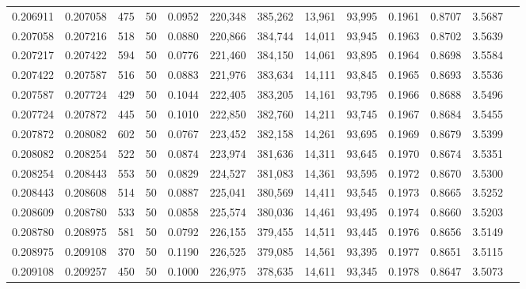 \begin{tabular}{rrrrrrrrrrrrr}
0.206911 & 0.207058 &   475 &  50 &                                     0.0952 & 220,348 & 385,262 &  13,961 &  93,995 & 0.1961 & 0.8707 & 3.5687 \\
0.207058 & 0.207216 &   518 &  50 &                                     0.0880 & 220,866 & 384,744 &  14,011 &  93,945 & 0.1963 & 0.8702 & 3.5639 \\
0.207217 & 0.207422 &   594 &  50 &                                     0.0776 & 221,460 & 384,150 &  14,061 &  93,895 & 0.1964 & 0.8698 & 3.5584 \\
0.207422 & 0.207587 &   516 &  50 &                                     0.0883 & 221,976 & 383,634 &  14,111 &  93,845 & 0.1965 & 0.8693 & 3.5536 \\
0.207587 & 0.207724 &   429 &  50 &                                     0.1044 & 222,405 & 383,205 &  14,161 &  93,795 & 0.1966 & 0.8688 & 3.5496 \\
0.207724 & 0.207872 &   445 &  50 &                                     0.1010 & 222,850 & 382,760 &  14,211 &  93,745 & 0.1967 & 0.8684 & 3.5455 \\
0.207872 & 0.208082 &   602 &  50 &                                     0.0767 & 223,452 & 382,158 &  14,261 &  93,695 & 0.1969 & 0.8679 & 3.5399 \\
0.208082 & 0.208254 &   522 &  50 &                                     0.0874 & 223,974 & 381,636 &  14,311 &  93,645 & 0.1970 & 0.8674 & 3.5351 \\
0.208254 & 0.208443 &   553 &  50 &                                     0.0829 & 224,527 & 381,083 &  14,361 &  93,595 & 0.1972 & 0.8670 & 3.5300 \\
0.208443 & 0.208608 &   514 &  50 &                                     0.0887 & 225,041 & 380,569 &  14,411 &  93,545 & 0.1973 & 0.8665 & 3.5252 \\
0.208609 & 0.208780 &   533 &  50 &                                     0.0858 & 225,574 & 380,036 &  14,461 &  93,495 & 0.1974 & 0.8660 & 3.5203 \\
0.208780 & 0.208975 &   581 &  50 &                                     0.0792 & 226,155 & 379,455 &  14,511 &  93,445 & 0.1976 & 0.8656 & 3.5149 \\
0.208975 & 0.209108 &   370 &  50 &                                     0.1190 & 226,525 & 379,085 &  14,561 &  93,395 & 0.1977 & 0.8651 & 3.5115 \\
0.209108 & 0.209257 &   450 &  50 &                                     0.1000 & 226,975 & 378,635 &  14,611 &  93,345 & 0.1978 & 0.8647 & 3.5073 \\

\end{tabular}
